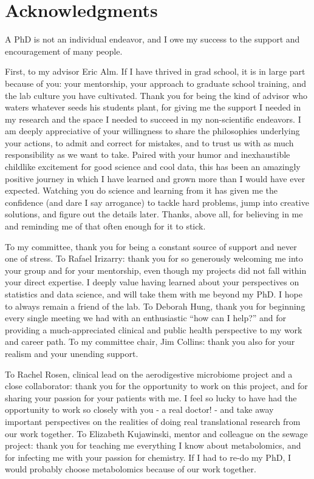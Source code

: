 \section*{Acknowledgments}

A PhD is not an individual endeavor, and I owe my success to the support and encouragement of many people.

First, to my advisor Eric Alm.
If I have thrived in grad school, it is in large part because of you: your mentorship, your approach to graduate school training, and the lab culture you have cultivated.
Thank you for being the kind of advisor who waters whatever seeds his students plant, for giving me the support I needed in my research and the space I needed to succeed in my non-scientific endeavors.
I am deeply appreciative of your willingness to share the philosophies underlying your actions, to admit and correct for mistakes, and to trust us with as much responsibility as we want to take.
Paired with your humor and inexhaustible childlike excitement for good science and cool data, this has been an amazingly positive journey in which I have learned and grown more than I would have ever expected.
Watching you do science and learning from it has given me the confidence (and dare I say arrogance) to tackle hard problems, jump into creative solutions, and figure out the details later.
Thanks, above all, for believing in me and reminding me of that often enough for it to stick.

To my committee, thank you for being a constant source of support and never one of stress.
To Rafael Irizarry: thank you for so generously welcoming me into your group and for your mentorship, even though my projects did not fall within your direct expertise.
I deeply value having learned about your perspectives on statistics and data science, and will take them with me beyond my PhD.
I hope to always remain a friend of the lab.
To Deborah Hung, thank you for beginning every single meeting we had with an enthusiastic ``how can I help?'' and for providing a much-appreciated clinical and public health perspective to my work and career path.
To my committee chair, Jim Collins: thank you also for your realism and your unending support.

To Rachel Rosen, clinical lead on the aerodigestive microbiome project and a close collaborator: thank you for the opportunity to work on this project, and for sharing your passion for your patients with me.
I feel so lucky to have had the opportunity to work so closely with you - a real doctor! - and take away important perspectives on the realities of doing real translational research from our work together.
To Elizabeth Kujawinski, mentor and colleague on the sewage project: thank you for teaching me everything I know about metabolomics, and for infecting me with your passion for chemistry.
If I had to re-do my PhD, I would probably choose metabolomics because of our work together.

